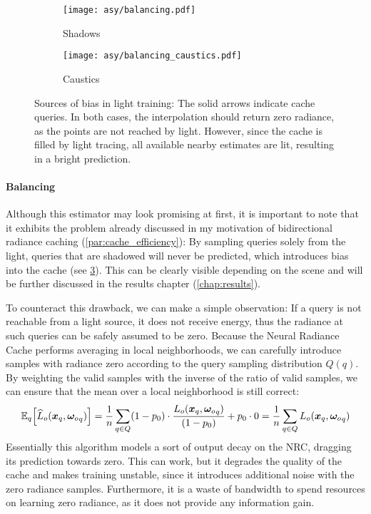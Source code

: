 \begin{figure}[htb!]
    \centering
    \begin{subfigure}{0.5\textwidth}
        \centering
        \texttt{[image: asy/balancing.pdf]}
        \caption{Shadows}
        \label{fig:balancing_shadows}
    \end{subfigure}%
    \begin{subfigure}{0.5\textwidth}
        \centering
        \texttt{[image: asy/balancing\_caustics.pdf]}
        \caption{Caustics}
        \label{fig:balancing_caustics}
    \end{subfigure}
    \caption{Sources of bias in light training: The solid arrows indicate cache queries. In both cases, the interpolation should return zero radiance, as the points are not reached by light. However, since the cache is filled by light tracing, all available nearby estimates are lit, resulting in a bright prediction.}
    \label{fig:balancing}
\end{figure}

\paragraph{Balancing} Although this estimator may look promising at first, it is important to note that it exhibits the problem already discussed in my motivation of bidirectional radiance caching (\cref{par:cache_efficiency}):
By sampling queries solely from the light, queries that are shadowed will never be predicted, which introduces bias into the cache (see \cref{fig:balancing}).
This can be clearly visible depending on the scene and will be further discussed in the results chapter (\cref{chap:results}).

To counteract this drawback, we can make a simple observation:
If a query is not reachable from a light source, it does not receive energy, thus the radiance at such queries can be safely assumed to be zero.
Because the Neural Radiance Cache performs averaging in local neighborhoods, we can carefully introduce samples with radiance zero according to the query sampling distribution $Q(q)$.
By weighting the valid samples with the inverse of the ratio of valid samples, we can ensure that the mean over a local neighborhood is still correct:
\begin{equation}
\expectationvar{q}{{\widehat{L}_o}(\vec{x}_q, \wo_q)} = \frac{1}{n} \sum_{q \in Q} (1 - p_0) \cdot \frac{L_o(\vec{x}_q, \wo_q)}{(1 - p_0)} + p_0 \cdot 0 = \frac{1}{n} \sum_{q \in Q} L_o(\vec{x}_q, \wo_q)
\end{equation}
Essentially this algorithm models a sort of output decay on the NRC, dragging its prediction towards zero.
This can work, but it degrades the quality of the cache and makes training unstable, since it introduces additional noise with the zero radiance samples.
Furthermore, it is a waste of bandwidth to spend resources on learning zero radiance, as it does not provide any information gain.

